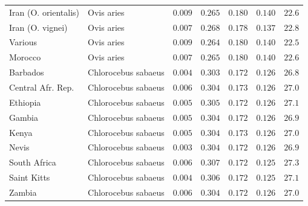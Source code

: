 \documentclass{article}
\begin{document}
\begin{center}
\begin{longtable*}{|l|l|r|r|r|r|r|}
            Iran (O. orientalis) &          Ovis aries &               $ 0.009$ &                $ 0.265$ &        $ 0.180$ &              $ 0.140$ &           $  22.6$ \\
            Iran (O. vignei) &          Ovis aries &               $ 0.007$ &                $ 0.268$ &        $ 0.178$ &              $ 0.137$ &           $  22.8$ \\
            Various &          Ovis aries &               $ 0.009$ &                $ 0.264$ &        $ 0.180$ &              $ 0.140$ &           $  22.5$ \\
            Morocco &          Ovis aries &               $ 0.007$ &                $ 0.265$ &        $ 0.180$ &              $ 0.140$ &           $  22.6$ \\
            Barbados & Chlorocebus sabaeus &               $ 0.004$ &                $ 0.303$ &        $ 0.172$ &              $ 0.126$ &           $  26.8$ \\
            Central Afr. Rep. & Chlorocebus sabaeus &               $ 0.006$ &                $ 0.304$ &        $ 0.173$ &              $ 0.126$ &           $  27.0$ \\
            Ethiopia & Chlorocebus sabaeus &               $ 0.005$ &                $ 0.305$ &        $ 0.172$ &              $ 0.126$ &           $  27.1$ \\
            Gambia & Chlorocebus sabaeus &               $ 0.005$ &                $ 0.304$ &        $ 0.172$ &              $ 0.126$ &           $  26.9$ \\
            Kenya & Chlorocebus sabaeus &               $ 0.005$ &                $ 0.304$ &        $ 0.173$ &              $ 0.126$ &           $  27.0$ \\
            Nevis & Chlorocebus sabaeus &               $ 0.003$ &                $ 0.304$ &        $ 0.172$ &              $ 0.126$ &           $  26.9$ \\
            South Africa & Chlorocebus sabaeus &               $ 0.006$ &                $ 0.307$ &        $ 0.172$ &              $ 0.125$ &           $  27.3$ \\
            Saint Kitts & Chlorocebus sabaeus &               $ 0.004$ &                $ 0.306$ &        $ 0.172$ &              $ 0.125$ &           $  27.1$ \\
            Zambia & Chlorocebus sabaeus &               $ 0.006$ &                $ 0.304$ &        $ 0.172$ &              $ 0.126$ &           $  27.0$ \\

\end{longtable*}
\end{center}
\end{document}
